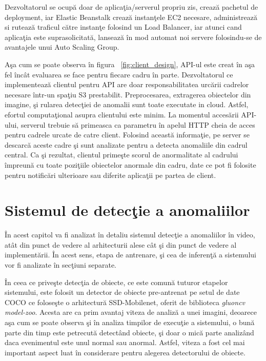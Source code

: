 \documentclass[a4paper,12pt]{report}
\begin{document}
Dezvoltatorul se ocupă doar de aplicaţia/serverul propriu zis, crează pachetul de deployment, iar Elastic Beanstalk crează instanţele EC2 necesare, administrează si rutează traficul către instanţe folosind un Load Balancer, iar atunci cand aplicaţia este suprasolicitată, lansează în mod automat noi servere folosindu-se de avantajele unui Auto Scaling Group.
\par Aşa cum se poate observa în figura ~\ref{fig:client_design}, API-ul este creat în aşa fel încât evaluarea se face pentru fiecare cadru în parte. Dezvoltatorul ce implementează clientul pentru API are doar responsabilitatea urcării cadrelor necesare într-un spaţiu S3 prestabilit. Preprocesarea, extragerea obiectelor din imagine, şi rularea detecţiei de anomalii sunt toate executate in cloud. Astfel, efortul computaţional asupra clientului este minim. La momentul accesării API-ului, serverul trebuie să primeasca ca parametru în apelul HTTP cheia de acces pentru cadrele urcate de catre client. Folosind această informaţie, pe server se descarcă aceste cadre şi sunt analizate pentru a detecta anomaliile din cadrul central. Ca şi rezultat, clientul primeşte scorul de anormalitate al cadrului împreună cu toate poziţiile obiectelor anormale din cadru, date ce pot fi folosite pentru notificări ulterioare sau diferite aplicaţii pe partea de client. 

\chapter{Sistemul de detecţie a anomaliilor}
\quad În acest capitol va fi analizat în detaliu sistemul detecţie a anomaliilor în video, atât din punct de vedere al arhitecturii alese cât şi din punct de vedere al implementării. În acest sens, etapa de antrenare, şi cea de inferenţă a sistemului vor fi analizate în secţiuni separate.
\par În ceea ce priveşte detecţia de obiecte, ce este comună tuturor etapelor sistemului, este folosit un detector de obiecte pre-antrenat pe setul de date COCO ce foloseşte o arhitectură SSD-Mobilenet, oferit de biblioteca \emph {gluoncv model-zoo}. Acesta are ca prim avantaj viteza de analiză a unei imagini, deoarece aşa cum se poate observa şi în analiza timpilor de execuţie a sistemului, o bună parte din timp este petrecută detectând obiecte, şi doar o mică parte analizând daca evenimentul este unul normal sau anormal. Astfel, viteza a fost cel mai important aspect luat în considerare pentru alegerea detectorului de obiecte.
\end{document}
